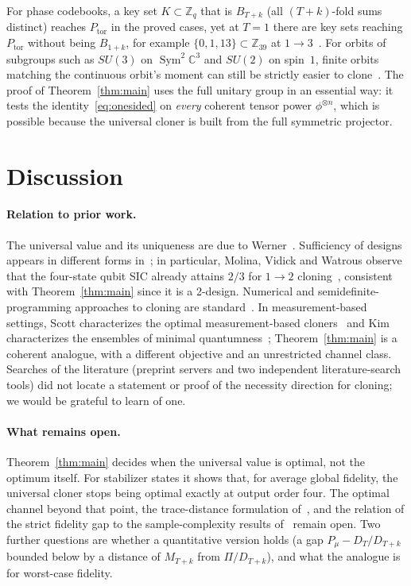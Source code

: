 \documentclass[11pt]{article}
\newcommand{\C}{\mathbb{C}}
\newcommand{\Sym}{\operatorname{Sym}}
\newcommand{\Ptor}{P_{\mathrm{tor}}}
\theoremstyle{definition}
\theoremstyle{remark}
\begin{document}
For phase codebooks, a key set $K\subset\mathbb Z_q$ that is $B_{T+k}$ (all $(T+k)$-fold sums distinct) reaches
$\Ptor$ in the proved cases, yet at $T=1$ there are key sets reaching $\Ptor$ without being $B_{1+k}$, for example
$\{0,1,13\}\subset\mathbb Z_{39}$ at $1\to3$~\cite[\S5.4]{Weldon2026}. For orbits of subgroups such as $SU(3)$ on
$\Sym^2\C^3$ and $SU(2)$ on spin~$1$, finite orbits matching the continuous orbit's moment can still be strictly
easier to clone~\cite[Thm.~31]{Weldon2026}. The proof of Theorem~\ref{thm:main} uses the full unitary group in an
essential way: it tests the identity~\eqref{eq:onesided} on \emph{every} coherent tensor power $\phi^{\otimes n}$, which
is possible because the universal cloner is built from the full symmetric projector.

\section{Discussion}\label{sec:discussion}
\paragraph{Relation to prior work.} The universal value and its uniqueness are due to Werner~\cite[Sec.~4]{Werner1998}.
Sufficiency of designs appears in different forms in~\cite{MVW2012,Kay2014}; in particular, Molina, Vidick and Watrous
observe that the four-state qubit SIC already attains $2/3$ for $1\to2$ cloning~\cite{MVW2012}, consistent with
Theorem~\ref{thm:main} since it is a 2-design. Numerical and semidefinite-programming approaches to cloning are
standard~\cite{Koniorczyk2013}. In measurement-based settings, Scott characterizes the optimal measurement-based
cloners~\cite[Thm.~20]{Scott2006} and Kim characterizes the ensembles of minimal quantumness~\cite{Kim2006};
Theorem~\ref{thm:main} is a coherent analogue, with a different objective and an unrestricted channel class. Searches of the literature (preprint servers
and two independent literature-search tools) did not locate a statement or proof of the necessity direction for
cloning; we would be grateful to learn of one.

\paragraph{What remains open.} Theorem~\ref{thm:main} decides when the universal value is optimal, not the optimum
itself. For stabilizer states it shows that, for average global fidelity, the universal cloner stops being optimal exactly
at output order four. The optimal channel beyond that point, the trace-distance formulation of~\cite{Herasymenko2026},
and the relation of the strict fidelity gap to the sample-complexity results of~\cite{Bansal2026} remain open. Two further questions are whether a quantitative version holds (a gap $P_\mu-D_T/D_{T+k}$
bounded below by a distance of $M_{T+k}$ from $\Pi/D_{T+k}$), and what the analogue is for worst-case fidelity.
\end{document}
